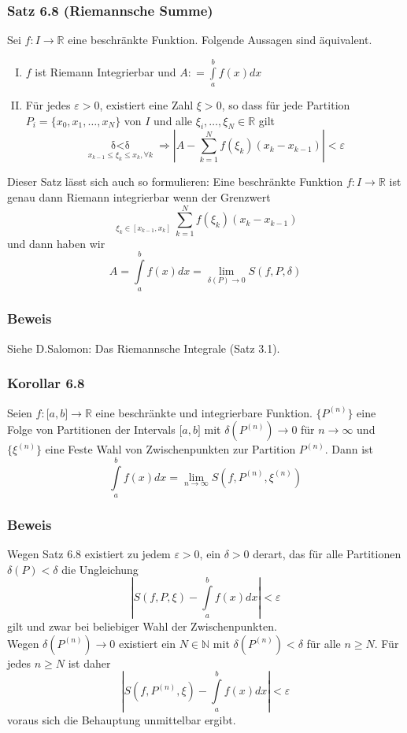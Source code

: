 \subsubsection*{Satz 6.8 (Riemannsche Summe)}
Sei $f:I\rightarrow \mathbb{R}$ eine beschränkte Funktion. Folgende Aussagen sind äquivalent.
\begin{enumerate}[I)]
\item $f$ ist Riemann Integrierbar und $A: = \int\limits_a^b {f(x)dx} $
\item Für jedes $\varepsilon>0$, existiert eine Zahl $\xi>0$, so dass für jede Partition $P_i=\{x_0,x_1,\dots,x_N\}$ von $I$ und alle $\xi_i,\dots,\xi_N \in \mathbb{R}$ gilt $$\mathop {\delta (P) < \delta }\limits_{{x_{k - 1}} \le {\xi _k} \le {x_k},\forall k}  \Rightarrow \left| {A - \sum\limits_{k = 1}^N {f({\xi _k})({x_k} - {x_{k - 1}})} } \right| < \varepsilon $$
\end{enumerate}
Dieser Satz lässt sich auch so formulieren: Eine beschränkte Funktion $f:I\rightarrow\mathbb{R}$ ist genau dann Riemann integrierbar wenn der Grenzwert $$\mathop {\mathop {\lim }\limits_{\delta (P) \to 0} }\limits_{{\xi _k} \in [{x_{k - 1}},{x_k}]} \sum\limits_{k = 1}^N {f({\xi _k})({x_k} - {x_{k - 1}})} $$ und dann haben wir $$A=\int\limits_a^b {f(x)dx = \mathop {\lim }\limits_{\delta (P) \to 0} } S(f,P,\delta )$$

\subsubsection*{Beweis} Siehe D.Salomon: Das Riemannsche Integrale (Satz 3.1).
\subsubsection*{Korollar 6.8}
Seien $f:\lbrack a,b\rbrack\rightarrow\mathbb{R}$ eine beschränkte und integrierbare Funktion. $\{ P^{(n)}\}$ eine Folge von Partitionen der Intervals $\lbrack a,b\rbrack$ mit $\delta(P^{(n)})\rightarrow 0$ für $n\rightarrow\infty$ und $\{\xi^{(n)}\}$ eine Feste Wahl von Zwischenpunkten zur Partition $P^{(n)}$. Dann ist
\[\int\limits_a^b {f(x)dx = \mathop {\lim }\limits_{n \to \infty } S(f,{P^{(n)}},{\xi ^{(n)}})} \]
\subsubsection*{Beweis}
Wegen Satz 6.8 existiert zu jedem $\varepsilon>0$, ein $\delta>0$ derart, das für alle Partitionen $\delta(P)<\delta$ die Ungleichung 
\[\left| {S(f,P,\xi ) - \int\limits_a^b {f(x)dx} } \right| < \varepsilon \]
gilt und zwar bei beliebiger Wahl der Zwischenpunkten.\\
Wegen  $\delta(P^{(n)})\rightarrow 0$ existiert ein $N\in\mathbb{N}$ mit $\delta(P^{(n)})<\delta$ für alle $n\geq N$.
Für jedes $n\geq N$ ist daher \[\left| {S(f,{P^{(n)}},\xi ) - \int\limits_a^b {f(x)dx} } \right| < \varepsilon \] voraus sich die Behauptung unmittelbar ergibt. 
